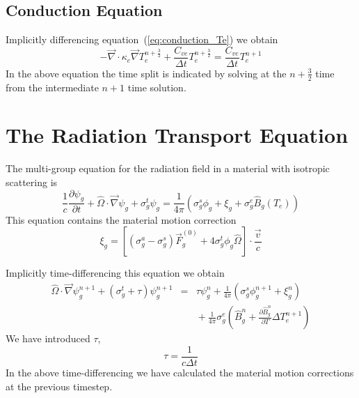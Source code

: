\documentclass{article}
\newcommand{\partl}[2]{\ensuremath{\frac{\partial{#1}}{\partial{#2}}}}\newcommand{\del}{\ensuremath{\vec{\nabla}}}
\newcommand{\dt}{\ensuremath{\Delta t}}
\newcommand{\Bg}{\ensuremath{\hat{B}_{g}}}
\newcommand{\Bgn}{\ensuremath{\hat{B}_{g}^{n}}}
\newcommand{\pBgndT}{\ensuremath{\frac{\partial\Bgn}{\partial T}}}
\begin{document}
\subsection{Conduction Equation}

Implicitly differencing equation~(\ref{eq:conduction_Te})
we obtain
\begin{equation}
  \boxed{
     - \del \cdot \kappa_{e} \del T^{n+\frac{3}{2}}_{e}
     + \frac{C_{ve}}{\Delta t} T^{n+\frac{3}{2}}_{e}
           = \frac{C_{ve}}{\Delta t} T^{n+1}_{e}
   }
\label{eq:conduction_Te_tdiff}  
\end{equation}
In the above equation the time split is indicated by solving at the
$n+\frac{3}{2}$ time from the intermediate $n+1$ time solution.

\section{The Radiation Transport Equation}

The multi-group equation for the radiation field in a material
with isotropic scattering is
\begin{equation}
        \frac{1}{c} \partl{\psi_{g}}{t}
        + \hat{\Omega} \cdot \del \psi_{g}
        + \sigma^{t}_{g} \psi_{g}
        = \frac{1}{4 \pi}
         \left( \sigma^{s}_{g} \phi_{g}
                + \xi_{g}
                + \sigma^{e}_{g} \Bg(T_{e})
         \right)
\label{eq:psi}
\end{equation}
This equation contains the material motion correction
\begin{equation}
        \xi_{g} = \left[ (\sigma^{a}_{g} - \sigma^{s}_{g}) \vec{F}^{(0)}_{g}
                + 4 \sigma^{t}_{g} \phi_{g} \hat{\Omega} \right]
                        \cdot \frac{\vec{v}}{c}
\label{eq:xi}
\end{equation}

Implicitly time-differencing this equation we obtain
\begin{eqnarray}
\hat{\Omega} \cdot \del \psi^{n+1}_{g} + (\sigma^{t}_{g} + \tau) \psi^{n+1}_{g}
        &=&  \tau \psi_{g}^{n}
         + \frac{1}{4\pi} \left( \sigma^{s}_{g} \phi^{n+1}_{g}
        + \xi_{g}^{n} \right)
  \nonumber \\
    & & \mbox{}
        + \frac{1}{4\pi} \sigma^{e}_{g} 
                \left(\Bgn + \pBgndT \Delta T_{e}^{n+1} \right)
\label{eq:RadEq1}
\end{eqnarray}
We have introduced $\tau$,
\begin{equation}
        \tau = \frac{1}{c\dt}
\end{equation}
In the above time-differencing
we have calculated the material motion corrections at the previous timestep.
\end{document}
